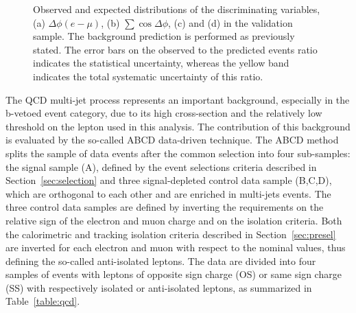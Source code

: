 \begin{figure}[htp]
\begin{center}
{        }

    \end{center}
    \caption{ Observed and expected distributions of the discriminating variables, (a) $\Delta\phi(e-\mu)$,
      (b) $\sum\cos\Delta\phi$, (c) \SumLtMET and (d) \Ht  in the \ttbar validation sample.
	The background prediction is performed as previously stated.
	The error bars on the observed to the predicted events ratio indicates the statistical uncertainty,
	whereas the yellow band indicates the total systematic uncertainty of this ratio.} 
 
   \label{fig:cutsttbar}
\end{figure}


The QCD multi-jet process represents an important background, 
especially in the b-vetoed event category, due to its high cross-section and the 
relatively low threshold on the lepton \pt used in this analysis. The contribution of this
background is evaluated by the so-called ABCD data-driven technique.
The ABCD method splits the sample of data events after the common selection into four sub-samples: the
signal sample (A), defined by the event selections criteria described in Section~\ref{sec:selection}
and three signal-depleted control data sample (B,C,D), which are orthogonal to each other  and are
enriched in multi-jets events. The three control data samples are defined by inverting the requirements on the relative 
sign of the electron and muon charge  and  on the isolation criteria. 
Both the calorimetric and tracking isolation criteria described in Section~\ref{sec:presel}  are inverted for each electron and muon 
with respect to the nominal values, thus defining the so-called anti-isolated leptons. 
The data are divided into four samples of events with leptons of opposite sign charge (OS) 
or same sign charge (SS) with respectively isolated or anti-isolated leptons, as summarized in Table~\ref{table:qcd}.

